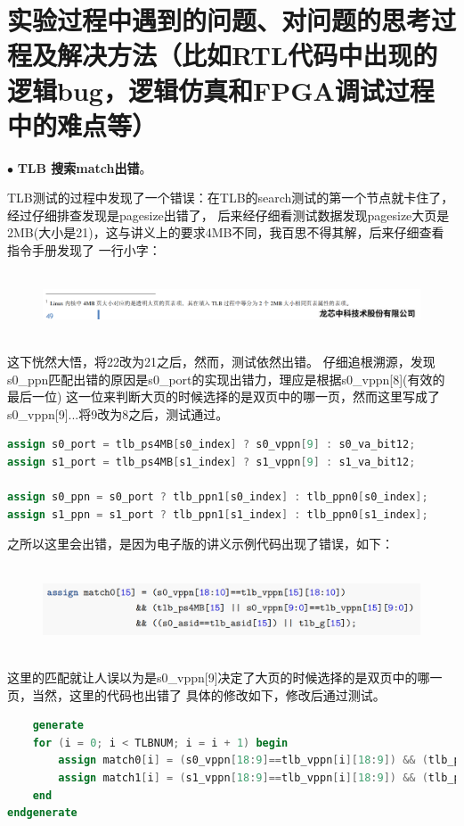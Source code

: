 \documentclass[11pt]{article}
\begin{document}
\section{实验过程中遇到的问题、对问题的思考过程及解决方法（比如RTL代码中出现的逻辑bug，逻辑仿真和FPGA调试过程中的难点等）}

\noindent
$\bullet$
\textbf{TLB 搜索match出错}。

TLB测试的过程中发现了一个错误：在TLB的search测试的第一个节点就卡住了，经过仔细排查发现是pagesize出错了，
后来经仔细看测试数据发现pagesize大页是2MB(大小是21)，这与讲义上的要求4MB不同，我百思不得其解，后来仔细查看指令手册发现了
一行小字：
\begin{figure}[H]
    \centering
    \includegraphics[width=13cm]{fig/3.png}
  \end{figure}
这下恍然大悟，将22改为21之后，然而，测试依然出错。
仔细追根溯源，发现s0_ppn匹配出错的原因是s0_port的实现出错力，理应是根据s0_vppn[8](有效的最后一位)
这一位来判断大页的时候选择的是双页中的哪一页，然而这里写成了s0_vppn[9]...将9改为8之后，测试通过。
\begin{lstlisting}[language=verilog]
assign s0_port = tlb_ps4MB[s0_index] ? s0_vppn[9] : s0_va_bit12;
assign s1_port = tlb_ps4MB[s1_index] ? s1_vppn[9] : s1_va_bit12;

assign s0_ppn = s0_port ? tlb_ppn1[s0_index] : tlb_ppn0[s0_index];
assign s1_ppn = s1_port ? tlb_ppn1[s1_index] : tlb_ppn0[s1_index];
\end{lstlisting}
之所以这里会出错，是因为电子版的讲义示例代码出现了错误，如下：
\begin{figure}[H]
    \centering
    \includegraphics[width=15cm]{fig/4.png}
  \end{figure}
这里的匹配就让人误以为是s0_vppn[9]决定了大页的时候选择的是双页中的哪一页，当然，这里的代码也出错了
具体的修改如下，修改后通过测试。
\begin{lstlisting}[language=verilog]
    generate
    for (i = 0; i < TLBNUM; i = i + 1) begin
        assign match0[i] = (s0_vppn[18:9]==tlb_vppn[i][18:9]) && (tlb_ps4MB[i] || s0_vppn[8:0]==tlb_vppn[i][8:0]) && ((s0_asid==tlb_asid[i]) || tlb_g[i]);
        assign match1[i] = (s1_vppn[18:9]==tlb_vppn[i][18:9]) && (tlb_ps4MB[i] || s1_vppn[8:0]==tlb_vppn[i][8:0]) && ((s1_asid==tlb_asid[i]) || tlb_g[i]);
    end
endgenerate
\end{lstlisting}
\end{document}

